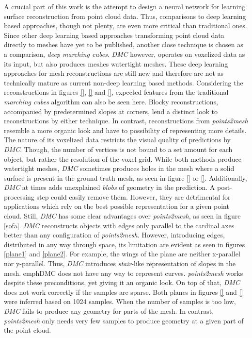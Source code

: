   A crucial part of this work is the attempt to design a neural network for learning surface reconstruction from point cloud data. Thus,
  comparisons to deep learning based approaches, though not plenty, are even more critical than traditional ones. 
  Since other deep learning based approaches transforming point cloud data directly to meshes have yet to be published,  another close technique
  is chosen as a comparison, \emph{deep marching cubes}.
  \emph{DMC} however, operates on voxelized data as its input, but also produces meshes watertight meshes. These deep learning approaches for mesh 
  reconstructions are still new and therefore are not as technically mature as current non-deep learning based methods.
  Considering the reconstructions in figures \ref{}, \ref{} and \ref{}, expected features from the traditional \emph{marching cubes} algorithm can
  also be seen here. Blocky reconstructions, accompanied by predetermined slopes at corners, lend a distinct look to reconstructions by either 
  technique. In contrast, reconstructions from \emph{points2mesh} resemble a more organic look and have to possibility of representing more details.
  The nature of its voxelized data restricts the visual quality of predictions by \emph{DMC}. Though, the number of vertices is not bound to a set
  amount for each object, but rather the resolution of the voxel grid. While both methods produce watertight meshes, \emph{DMC} sometimes produces
  holes in the mesh where a solid surface is present in the ground truth mesh, as seen in figure \ref{} or \ref{}. Additionally, \emph{DMC} at 
  times adds unexplained \emph{blobs} of geometry in the prediction. A post-processing step could easily remove them. However, they are detrimental
  for applications which rely on the best possible representation for a given point cloud.
  Still, \emph{DMC} has some clear advantages over \emph{points2mesh}, as seen in figure \ref{sofa}. \emph{DMC} reconstructs objects with edges only 
  parallel to the cardinal axes better than any configuration of \emph{points2mesh}. However, introducing edges, distributed in any way through space,
  its limitation are evident as seen in figures \ref{plane1} and \ref{plane2}. For example, the wings of the plane are neither x-parallel nor y-parallel.
  Thus, \emph{DMC} introduces \emph{stair}-like representation of slopes in the mesh. emph{DMC} does not have any way to represent curves. \emph{points2mesh}
  works despite these preconditions, yet giving it an organic look.
  On top of that, \emph{DMC} does not work correctly if the samples are sparse. Both planes in figures \ref{} and \ref{} were inferred based on 1024 samples.
  When the number of samples is too low, \emph{DMC} fails to produce any geometry for parts of the mesh.
  In contrast, \emph{points2mesh} only needs very few samples to produce geometry at a given part of the point cloud.

